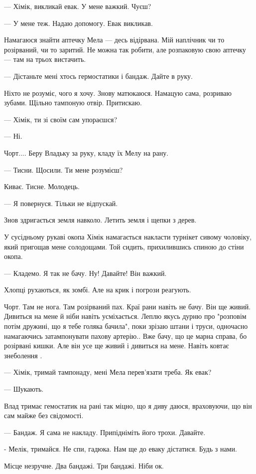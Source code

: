 — Хімік, викликай евак. У мене важкий. Чуєш? 

— У мене теж. Надаю допомогу. Евак  викликав. 

Намагаюся знайти аптечку Мела — десь відірвана. Мій наплічник чи то розірваний,
чи то заритий. Не можна так робити, але розпаковую свою аптечку — там на трьох
вистачить. 

— Дістаньте мені хтось гермостатики і бандаж. Дайте в руку. 

Ніхто не розуміє, чого я хочу. Знову матюкаюся. Намацую сама, розриваю зубами.
Щільно тампоную отвір. Притискаю. 

— Хімік, ти зі своїм сам упораєшся? 

— Ні. 

Чорт.... Беру Владьку за руку, кладу їх Мелу на рану. 

— Тисни. Щосили. Ти мене розумієш? 

Киває. Тисне. Молодець. 

— Я повернуся. Тільки не відпускай.

Знов здригається земля навколо. Летить земля і щепки з дерев. 

У сусідньому рукаві окопа Хімік намагається накласти турнікет сивому чоловіку,
який пригощав мене солодощами. Той сидить,  прихилившись спиною до стіни окопа.  

— Кладемо. Я так не бачу. Ну! Давайте! Він важкий. 

Хлопці рухаються, як зомбі. Але на крик і погрози реагують. 

Чорт. Там не нога. Там розірваний пах. Краї рани навіть не бачу. Він ще живий.
Дивиться на мене й ніби навіть усміхається. Леплю якусь дурню про "розповім
потім дружині, що я тебе голяка бачила", поки зрізаю штани і труси, одночасно
намагаючись затампонувати  пахову артерію.. Вже бачу, що це марна справа,  бо
розірвані кишки. Але він усе ще живий і дивиться на мене. Навіть ковтає
знеболення . 

— Хімік, тримай тампонаду, мені Мела перев'язати треба. Як евак?

— Шукають.

Влад тримає гемостатик на рані так міцно, що я диву даюся, враховуючи, що він
сам майже без свідомості. 

— Бандаж. Я сама не накладу. Припідніміть його трохи. Давайте. 

- Мелік, тримайся. Не спи, гадюка. Нам ще до еваку дістатися. Будь з нами. 

Місце незручне. Два бандажі. Три бандажі. Ніби ок. 

